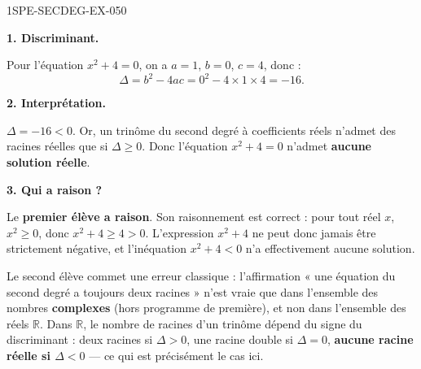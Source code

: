 \begin{corrige}{1SPE-SECDEG-EX-050}

\textbf{1. Discriminant.}


Pour l'équation $x^2 + 4 = 0$, on a $a = 1$, $b = 0$, $c = 4$, donc :
\[
\Delta = b^2 - 4ac = 0^2 - 4 \times 1 \times 4 = -16.
\]

\medskip
\textbf{2. Interprétation.}


$\Delta = -16 < 0$. Or, un trinôme du second degré à coefficients réels n'admet des racines réelles que si $\Delta \geqslant 0$. Donc l'équation $x^2 + 4 = 0$ n'admet \textbf{aucune solution réelle}.

\medskip
\textbf{3. Qui a raison ?}

Le \textbf{premier élève a raison}. Son raisonnement est correct : pour tout réel $x$, $x^2 \geqslant 0$, donc $x^2 + 4 \geqslant 4 > 0$. L'expression $x^2+4$ ne peut donc jamais être strictement négative, et l'inéquation $x^2 + 4 < 0$ n'a effectivement aucune solution.

Le second élève commet une erreur classique : l'affirmation « une équation du second degré a toujours deux racines » n'est vraie que dans l'ensemble des nombres \textbf{complexes} (hors programme de première), et non dans l'ensemble des réels $\mathbb{R}$. Dans $\mathbb{R}$, le nombre de racines d'un trinôme dépend du signe du discriminant : deux racines si $\Delta > 0$, une racine double si $\Delta = 0$, \textbf{aucune racine réelle si $\Delta < 0$} — ce qui est précisément le cas ici.

\end{corrige}
